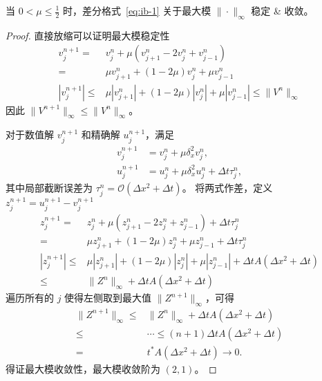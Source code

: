 \begin{example}
    当 $0 < \mu \le \frac12$ 时，差分格式~\eqref{eq:ib-1} 关于最大模 $\|\cdot\|_{\infty}$ 稳定 \& 收敛。
\end{example}

\begin{proof}
    直接放缩可以证明最大模稳定性
    \begin{align*}
        v_{j}^{n+1} ={}     &
        v_j^{n} + \mu (v_{j+1}^{n}-2v_j^{n}+v_{j-1}^{n})                        \\
        ={}                 & \mu v_{j+1}^{n} + (1-2\mu)v_j^{n}+\mu v_{j-1}^{n} \\
        |v_{j}^{n+1}| \le{} &
        \mu |v_{j+1}^{n}| + (1-2\mu)|v_j^{n}|+\mu |v_{j-1}^{n}| \le{}  \|V^{n}\|_{\infty}
    \end{align*}
    因此 $\|V^{n+1}\|_{\infty} \le{} \|V^{n}\|_{\infty}$。

    对于数值解 $v_{j}^{n+1}$ 和精确解 $u_{j}^{n+1}$，满足
    \begin{align*}
        v_{j}^{n+1} & = v_j^{n} + \mu \delta_x^2 v_j^{n},                       \\
        u_{j}^{n+1} & = u_j^{n} + \mu \delta_x^2 u_j^{n} + \Delta t \tau_j^{n},
    \end{align*}
    其中局部截断误差为 $\tau_j^{n} = \mathcal{O}(\Delta x^2 + \Delta t)$。
    将两式作差，定义 $z_{j}^{n+1}=u_{j}^{n+1}-v_{j}^{n+1}$
    \begin{align*}
        z_{j}^{n+1} ={}     &
        z_j^{n} + \mu (z_{j+1}^{n}-2z_j^{n}+z_{j-1}^{n}) + \Delta t \tau_j^{n}
        \\
        ={}                 & \mu z_{j+1}^{n} + (1-2\mu)z_j^{n}+\mu z_{j-1}^{n}+ \Delta t \tau_j^{n}
        \\
        |z_{j}^{n+1}| \le{} &
        \mu |z_{j+1}^{n}| + (1-2\mu)|z_j^{n}| + \mu |z_{j-1}^{n}| + \Delta t A (\Delta x^2 + \Delta t)
        \\
        \le{}               & \|Z^{n}\|_{\infty}+ \Delta t A (\Delta x^2 + \Delta t)
    \end{align*}
    遍历所有的 $j$ 使得左侧取到最大值 $\|Z^{n+1}\|_{\infty}$，可得
    \begin{align*}
        \|Z^{n+1}\|_{\infty} \le{} & \|Z^{n}\|_{\infty}+ \Delta t A (\Delta x^2 + \Delta t)
        \\ \le{} & \cdots \le (n+1)\Delta t A (\Delta x^2 + \Delta t) \\
        ={}                        & t^* A (\Delta x^2 + \Delta t) \to 0.
    \end{align*}
    得证最大模收敛性，最大模收敛阶为 $(2,1)$。
\end{proof}


